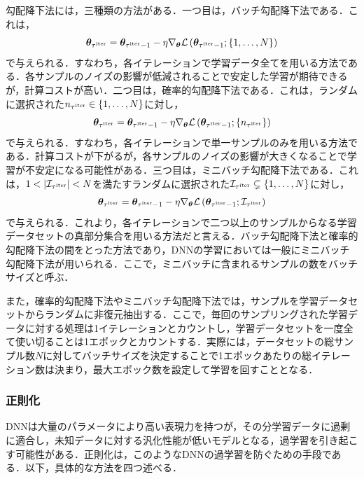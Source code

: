 \documentclass[12pt]{jarticle}
\numberwithin{equation}{section}    %
\numberwithin{figure}{section}      %
\numberwithin{table}{section}      %
\begin{document}
勾配降下法には，三種類の方法がある\cite{zhang2019gradient}．一つ目は，バッチ勾配降下法である．これは，
\begin{equation}
    \bm{\theta}_{\tau^{\text{iter}}} = \bm{\theta}_{\tau^{\text{iter}} - 1} - \eta \nabla_{\bm{\theta}} \mathcal{L}\left(\bm{\theta}_{\tau^{\text{iter}} - 1}; \{1, \ldots, N\}\right)
\end{equation}
で与えられる．すなわち，各イテレーションで学習データ全てを用いる方法である．各サンプルのノイズの影響が低減されることで安定した学習が期待できるが，計算コストが高い．二つ目は，確率的勾配降下法である．これは，ランダムに選択された$n_{\tau^{\text{iter}}} \in \{1, \ldots, N\}$に対し，
\begin{equation}
    \bm{\theta}_{\tau^{\text{iter}}} = \bm{\theta}_{\tau^{\text{iter}} - 1} - \eta \nabla_{\bm{\theta}} \mathcal{L}\left(\bm{\theta}_{\tau^{\text{iter}} - 1}; \{n_{\tau^{\text{iter}}}\}\right)
\end{equation}
で与えられる．すなわち，各イテレーションで単一サンプルのみを用いる方法である．計算コストが下がるが，各サンプルのノイズの影響が大きくなることで学習が不安定になる可能性がある．三つ目は，ミニバッチ勾配降下法である．これは，$1 < |\mathcal{I}_{\tau^{\text{iter}}}| < N$を満たすランダムに選択された$\mathcal{I}_{\tau^{\text{iter}}} \subsetneq \{1, \ldots, N\}$に対し，
\begin{equation}
    \bm{\theta}_{\tau^{\text{iter}}} = \bm{\theta}_{\tau^{\text{iter}} - 1} - \eta \nabla_{\bm{\theta}} \mathcal{L}\left(\bm{\theta}_{\tau^{\text{iter}} - 1}; \mathcal{I}_{\tau^{\text{iter}}}\right)
\end{equation}
で与えられる．これより，各イテレーションで二つ以上のサンプルからなる学習データセットの真部分集合を用いる方法だと言える．バッチ勾配降下法と確率的勾配降下法の間をとった方法であり，DNNの学習においては一般にミニバッチ勾配降下法が用いられる．ここで，ミニバッチに含まれるサンプルの数をバッチサイズと呼ぶ．

また，確率的勾配降下法やミニバッチ勾配降下法では，サンプルを学習データセットからランダムに非復元抽出する．ここで，毎回のサンプリングされた学習データに対する処理は1イテレーションとカウントし，学習データセットを一度全て使い切ることは1エポックとカウントする．実際には，データセットの総サンプル数$N$に対してバッチサイズを決定することで1エポックあたりの総イテレーション数は決まり，最大エポック数を設定して学習を回すこととなる．

\subsubsection{正則化}
DNNは大量のパラメータにより高い表現力を持つが，その分学習データに過剰に適合し，未知データに対する汎化性能が低いモデルとなる，過学習を引き起こす可能性がある．正則化は，このようなDNNの過学習を防ぐための手段である．以下，具体的な方法を四つ述べる．
\end{document}

